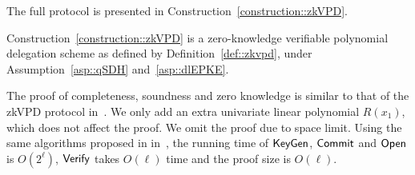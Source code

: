 The full protocol is presented in Construction~\ref{construction::zkVPD}.




\begin{theorem}\label{thm:zkvpd}
	Construction~\ref{construction::zkVPD} is a zero-knowledge verifiable polynomial delegation scheme as defined by Definition~\ref{def::zkvpd}, under Assumption~\ref{asp::qSDH} and~\ref{asp::dlEPKE}.
\end{theorem}

The proof of completeness, soundness and zero knowledge is similar to that of the zkVPD protocol in~\cite{zkvpd}. We only add an extra univariate linear polynomial $R(x_1)$, which does not affect the proof. We omit the proof due to space limit. Using the same algorithms proposed in in~\cite{vram,zkvpd}, the running time of $\mathsf{KeyGen}$, $\mathsf{Commit}$ and $\mathsf{Open}$ is $O(2^\ell)$, $\mathsf{Verify}$ takes $O(\ell)$ time and the proof size is $O(\ell)$.


